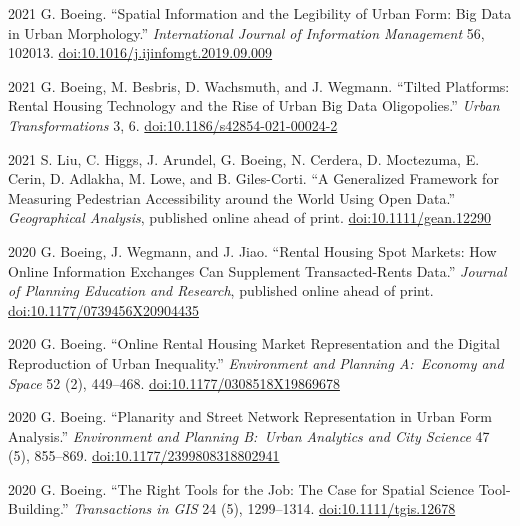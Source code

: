 \documentclass[12pt,letterpaper]{report}
\begin{document}
\begin{tablist}
        \item[2021] \tab{}G. Boeing. \enquote{Spatial Information and the Legibility of Urban Form: Big Data in Urban Morphology.} \textit{International Journal of Information Management} 56, 102013. \href{https://doi.org/10.1016/j.ijinfomgt.2019.09.009}{doi:10.1016/j.ijinfomgt.2019.09.009}

        \item[2021] \tab{}G. Boeing, M. Besbris, D. Wachsmuth, and J. Wegmann. \enquote{Tilted Platforms: Rental Housing Technology and the Rise of Urban Big Data Oligopolies.} \textit{Urban Transformations} 3, 6. \href{https://doi.org/10.1186/s42854-021-00024-2}{doi:10.1186/s42854-021-00024-2}

        \item[2021] \tab{}S. Liu, C. Higgs, J. Arundel, G. Boeing, N. Cerdera, D. Moctezuma, E. Cerin, D. Adlakha, M. Lowe, and B. Giles-Corti. \enquote{A Generalized Framework for Measuring Pedestrian Accessibility around the World Using Open Data.} \textit{Geographical Analysis}, published online ahead of print. \href{https://doi.org/10.1111/gean.12290}{doi:10.1111/gean.12290}

        \item[2020] \tab{}G. Boeing, J. Wegmann, and J. Jiao. \enquote{Rental Housing Spot Markets: How Online Information Exchanges Can Supplement Transacted-Rents Data.} \textit{Journal of Planning Education and Research}, published online ahead of print. \href{https://doi.org/10.1177/0739456X20904435}{doi:10.1177/0739456X20904435}

        \item[2020] \tab{}G. Boeing. \enquote{Online Rental Housing Market Representation and the Digital Reproduction of Urban Inequality.} \textit{Environment and Planning A:\ Economy and Space} 52 (2), 449--468. \href{https://doi.org/10.1177/0308518X19869678}{doi:10.1177/0308518X19869678}

        \item[2020] \tab{}G. Boeing. \enquote{Planarity and Street Network Representation in Urban Form Analysis.} \textit{Environment and Planning B:\ Urban Analytics and City Science} 47 (5), 855--869. \href{https://doi.org/10.1177/2399808318802941}{doi:10.1177/2399808318802941}

        \item[2020] \tab{}G. Boeing. \enquote{The Right Tools for the Job: The Case for Spatial Science Tool-Building.} \textit{Transactions in GIS} 24 (5), 1299--1314. \href{https://doi.org/10.1111/tgis.12678}{doi:10.1111/tgis.12678}


\end{tablist}
\end{document}

